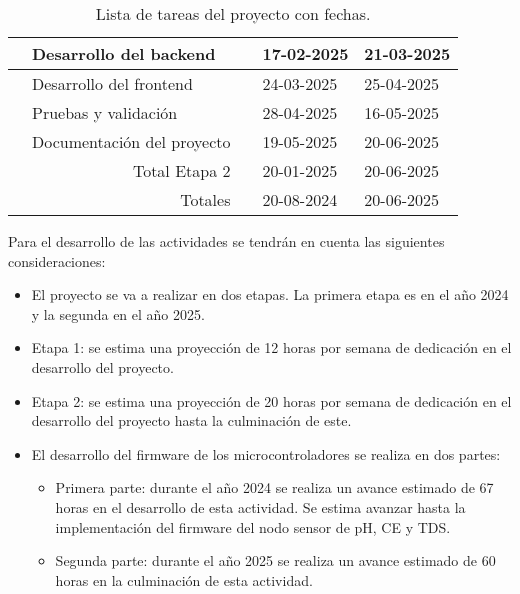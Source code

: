 \begin{table}[ht]
\begin{tabularx}{\linewidth}{|p{0.8cm}|p{8.33cm}|p{1cm}|p{1.8cm}|p{1.8cm}|}
		\centering{5}                       & Desarrollo del backend                            & \raggedleft{90} & 17-02-2025 & 21-03-2025 \\ \hline
		\centering{6}                       & Desarrollo del frontend                           & \raggedleft{93} & 24-03-2025 & 25-04-2025 \\ \hline
		\centering{7}                       & Pruebas y validación                              & \raggedleft{48} & 28-04-2025 & 16-05-2025 \\ \hline
		\centering{8}                       & Documentación del proyecto                        & \raggedleft{97} & 19-05-2025 & 20-06-2025 \\ \hline
		\multicolumn{2}{|r|}{Total Etapa 2} & \raggedleft{388}                                  & 20-01-2025      & 20-06-2025              \\ \hline
		\multicolumn{2}{|r|}{Totales}       & \raggedleft{615}                                  & 20-08-2024      & 20-06-2025              \\ \hline
	\end{tabularx}
	\caption{Lista de tareas del proyecto con fechas.}
	\label{tab:tabGantt}
\end{table}

Para el desarrollo de las actividades se tendrán en cuenta las siguientes
consideraciones:

\begin{itemize}
	\item El proyecto se va a realizar en dos etapas. La primera etapa es en el año 2024 y
	      la segunda en el año 2025.
	\item Etapa 1: se estima una proyección de 12 horas por semana de dedicación en el
	      desarrollo del proyecto.
	\item Etapa 2: se estima una proyección de 20 horas por semana de dedicación en el
	      desarrollo del proyecto hasta la culminación de este.
	\item El desarrollo del firmware de los microcontroladores se realiza en dos partes:
	      \begin{itemize}
		      \item Primera parte: durante el año 2024 se realiza un avance estimado de 67 horas en
		            el desarrollo de esta actividad. Se estima avanzar hasta la implementación del
		            firmware del nodo sensor de pH, CE y TDS.
		      \item Segunda parte: durante el año 2025 se realiza un avance estimado de 60 horas en
		            la culminación de esta actividad.
	      \end{itemize}

\end{itemize}

